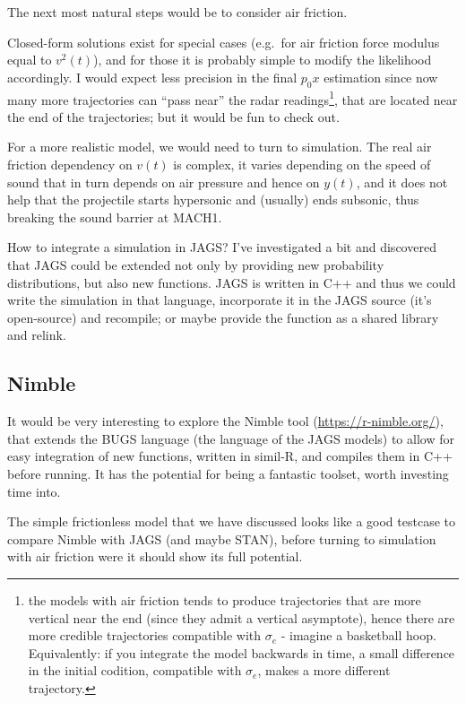 \documentclass[]{article}
\begin{document}
The next most natural steps would be to consider air friction.

Closed-form solutions exist for special cases (e.g.~for air friction
force modulus equal to \(v^2(t)\)), and for those it is probably simple
to modify the likelihood accordingly. I would expect less precision in
the final \(p_0x\) estimation since now many more trajectories can
``pass near'' the radar readings\footnote{the models with air friction
  tends to produce trajectories that are more vertical near the end
  (since they admit a vertical asymptote), hence there are more credible
  trajectories compatible with \(\sigma_e\) - imagine a basketball hoop.
  Equivalently: if you integrate the model backwards in time, a small
  difference in the initial codition, compatible with \(\sigma_e\),
  makes a more different trajectory.}, that are located near the end of
the trajectories; but it would be fun to check out.

For a more realistic model, we would need to turn to simulation. The
real air friction dependency on \(v(t)\) is complex, it varies depending
on the speed of sound that in turn depends on air pressure and hence on
\(y(t)\), and it does not help that the projectile starts hypersonic and
(usually) ends subsonic, thus breaking the sound barrier at MACH1.

How to integrate a simulation in JAGS? I've investigated a bit and
discovered that JAGS could be extended not only by providing new
probability distributions, but also new functions. JAGS is written in
C++ and thus we could write the simulation in that language, incorporate
it in the JAGS source (it's open-source) and recompile; or maybe provide
the function as a shared library and relink.

\hypertarget{nimble}{%
\subsection{Nimble}\label{nimble}}

It would be very interesting to explore the Nimble tool
(\url{https://r-nimble.org/}), that extends the BUGS language (the
language of the JAGS models) to allow for easy integration of new
functions, written in simil-R, and compiles them in C++ before running.
It has the potential for being a fantastic toolset, worth investing time
into.

The simple frictionless model that we have discussed looks like a good
testcase to compare Nimble with JAGS (and maybe STAN), before turning to
simulation with air friction were it should show its full potential.
\end{document}
